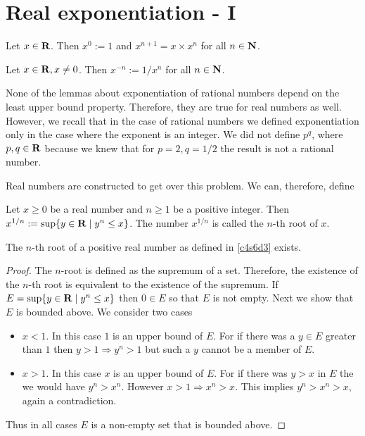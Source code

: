 \section{Real exponentiation - I}\label{c4s6}
\begin{defn}\label{c4s6d1}
Let $x \in \mathbf{R}$. Then $x^0 := 1$ and $x^{n+1} = x \times x^n$ for all
$n \in \mathbf{N}$.
\end{defn}

\begin{defn}\label{c4s6d2}
Let $x \in \mathbf{R}, x \ne 0$. Then $x^{-n} := 1/x^n$ for all $n \in \mathbf{N}$.
\end{defn}

None of the lemmas about exponentiation of rational numbers depend on
the least upper bound property. Therefore, they are true for real numbers
as well. However, we recall that in the case of rational numbers we 
defined exponentiation only in the case where the exponent is an integer.
We did not define $p^q$, where $p, q \in \mathbf{R}$ because we knew that for
$p = 2, q = 1/2$ the result is not a rational number.

Real numbers are constructed to get over this problem. We can, therefore,
define
\begin{defn}\label{c4s6d3}
Let $x \ge 0$ be a real number and $n \ge 1$ be a positive integer. Then
$x^{1/n} := \sup\{y \in \mathbf{R} \;|\; y^n \le x\}$. The number $x^{1/n}$ is
called the $n$-th root of $x$.
\end{defn}

\begin{lem}\label{c4s6l1}
The $n$-th root of a positive real number as defined in \ref{c4s6d3} 
exists.
\end{lem}
\begin{proof}
The $n$-root is defined as the supremum of a set. Therefore, the existence
of the $n$-th root is equivalent to the existence of the supremum. If
$E = \sup\{y \in \mathbf{R} \;|\; y^n \le x\}$ then $0 \in E$ so that $E$ is
not empty. Next we show that $E$ is bounded above. We consider two cases
\begin{itemize}
\item $x < 1$. In this case $1$ is an upper bound of $E$. For if there was
a $y \in E$ greater than $1$ then $y > 1 \Rightarrow y^n > 1$ but such a
$y$ cannot be a member of $E$.
\item $x > 1$. In this case $x$ is an upper bound of $E$. For if there was
$y > x$ in $E$ the we would have $y^n > x^n$. However $x > 1 \Rightarrow
x^n > x$. This implies $y^n > x^n > x$, again a contradiction.
\end{itemize}
Thus in all cases $E$ is a non-empty set that is bounded above.
\end{proof}

